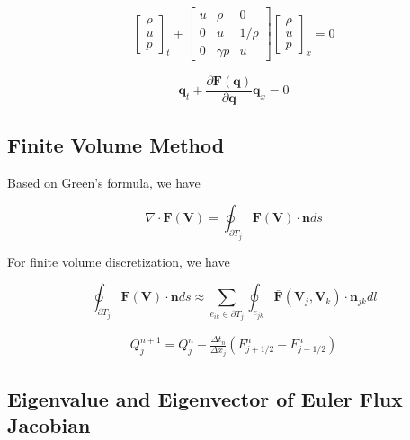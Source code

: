 \documentclass[11pt]{diazessay} %
\begin{document}
$$
\begin{bmatrix}
    \rho \\ u\\ p
\end{bmatrix}_t
+
\begin{bmatrix}
    u & \rho & 0\\
    0 & u & 1/\rho\\
    0 & \gamma p & u
\end{bmatrix}
\begin{bmatrix}
    \rho\\ u\\ p
\end{bmatrix}_x
=0
$$

$$
\textbf{q}_t + \frac{\partial \bar{\textbf{F}}(\textbf{q})}{\partial \textbf{q}}\textbf{q}_x= 0
$$


\subsection{Finite Volume Method}
Based on Green's formula, we have

$$
\nabla\cdot \textbf{F}(\textbf{V}) = \oint_{\partial T_j} \textbf{F}(\textbf{V})\cdot \textbf{n} ds
$$

For finite volume discretization, we have\cite{li_multigrid_nodate}

$$
\oint_{\partial T_j} \textbf{F}(\textbf{V})\cdot \textbf{n} ds 
\approx \sum_{e_{ik}\in \partial T_j} \oint_{e_{jk}} \bar{\textbf{F}}(\textbf{V}_j, \textbf{V}_k)\cdot \textbf{n}_{jk} dl
$$


\begin{align}
    Q_j^{n+1} = Q_j^n - \frac{\Delta t_n}{\Delta x_j} (F_{j+1/2}^n - F_{j-1/2}^n)
\end{align}

\subsection{Eigenvalue and Eigenvector of Euler Flux Jacobian}
\end{document}
